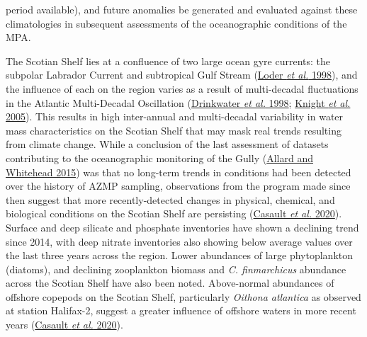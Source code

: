 \documentclass[12pt]{article}\usepackage[]{graphicx}\usepackage[]{color}
\begin{document}
period available), and future anomalies be generated and evaluated against these climatologies in subsequent assessments of the oceanographic conditions of the MPA.

The Scotian Shelf lies at a confluence of two large ocean gyre currents: the subpolar Labrador Current and subtropical Gulf Stream (\protect\hyperlink{ref-loder_1998}{Loder \textit{et al.} 1998}), and the influence of each on the region varies as a result of multi-decadal fluctuations in the Atlantic Multi-Decadal Oscillation (\protect\hyperlink{ref-drinkwater_1998}{Drinkwater \textit{et al.} 1998}; \protect\hyperlink{ref-knight_2005}{Knight \textit{et al.} 2005}). This results in high inter-annual and multi-decadal variability in water mass characteristics on the Scotian Shelf that may mask real trends resulting from climate change. While a conclusion of the last assessment of datasets contributing to the oceanographic monitoring of the Gully (\protect\hyperlink{ref-allard_2015}{Allard and Whitehead 2015}) was that no long-term trends in conditions had been detected over the history of AZMP sampling, observations from the program made since then suggest that more recently-detected changes in physical, chemical, and biological conditions on the Scotian Shelf are persisting (\protect\hyperlink{ref-casault_2020}{Casault \textit{et al.} 2020}). Surface and deep silicate and phosphate inventories have shown a declining trend since 2014, with deep nitrate inventories also showing below average values over the last three years across the region. Lower abundances of large phytoplankton (diatoms), and declining zooplankton biomass and \emph{C. finmarchicus} abundance across the Scotian Shelf have also been noted. Above-normal abundances of offshore copepods on the Scotian Shelf, particularly \emph{Oithona atlantica} as observed at station Halifax-2, suggest a greater influence of offshore waters in more recent years (\protect\hyperlink{ref-casault_2020}{Casault \textit{et al.} 2020}).
\end{document}
